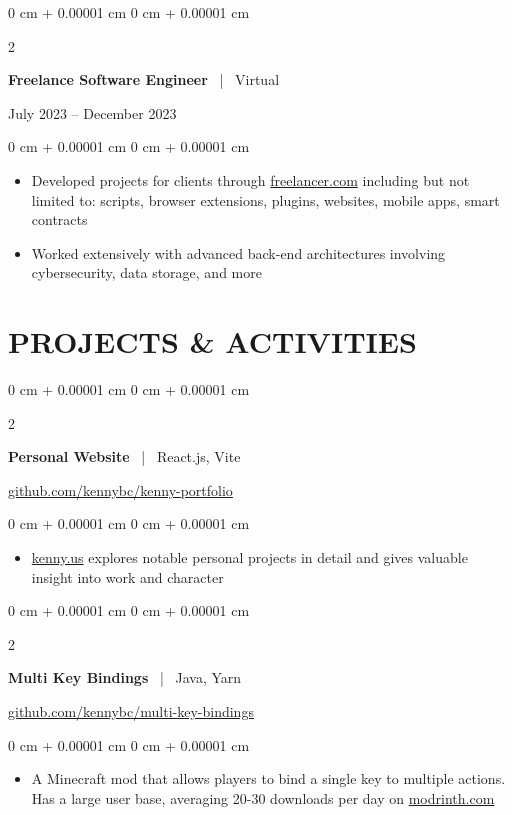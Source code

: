 \documentclass[10pt, letterpaper]{article}
\newenvironment{highlights}{
    \begin{itemize}[
        topsep=0pt,
        parsep=0pt,
        partopsep=0pt,
        itemsep=0pt,
        leftmargin=0 cm + 10pt
    ]
}{
    \end{itemize}
} %
\newenvironment{onecolentry}{
    \begin{adjustwidth}{
        0 cm + 0.00001 cm
    }{
        0 cm + 0.00001 cm
    }
}{
    \end{adjustwidth}
} %
\newenvironment{twocolentry}[2][]{
    \onecolentry
    \def\secondColumn{#2}
    \setcolumnwidth{\fill, 4.5 cm}
    \begin{paracol}{2}
}{
    \switchcolumn \raggedleft \secondColumn
    \end{paracol}
    \endonecolentry
} %
\newenvironment{repoentry}[2][]{
    \onecolentry
    \def\secondColumn{#2}
    \setcolumnwidth{\fill, \fill}
    \begin{paracol}{2}
}{
    \switchcolumn \raggedleft \secondColumn
    \end{paracol}
    \endonecolentry
} %
\begin{document}
	\vspace{0.2 cm}

	\begin{twocolentry}{July 2023 -- December 2023}
            \textbf{Freelance Software Engineer} ~|~ Virtual
	\end{twocolentry}
    \vspace{0.10 cm}
    \begin{onecolentry}
        \begin{highlights}
            \item Developed projects for clients through \href{https://freelancer.com}{freelancer.com} including but not limited to: scripts, browser extensions, plugins, websites, mobile apps, smart contracts
            \item Worked extensively with advanced back-end architectures involving cybersecurity, data storage, and more
        \end{highlights}
    \end{onecolentry}





    
    \section{PROJECTS \& ACTIVITIES}
	
	
	\begin{repoentry}{\href{https://github.com/kennybc/kenny-portfolio}{github.com/kennybc/kenny-portfolio}}
        \textbf{Personal Website} ~|~ React.js, Vite
	\end{repoentry}
    \vspace{0.10 cm}
    \begin{onecolentry}
        \begin{highlights}
            \item \href{https://kenny.us}{kenny.us} explores notable personal projects in detail and gives valuable insight into work and character
        \end{highlights}
    \end{onecolentry}
    
    \vspace{0.2 cm}
    
    \begin{repoentry}{\href{https://github.com/kennybc/multi-key-bindings}{github.com/kennybc/multi-key-bindings}}
    	\textbf{Multi Key Bindings} ~|~ Java, Yarn
    \end{repoentry}
    \vspace{0.10 cm}
    \begin{onecolentry}
    	\begin{highlights}
    		\item A Minecraft mod that allows players to bind a single key to multiple actions. Has a large user base, averaging 20-30 downloads per day on \href{https://modrinth.com/mod/multi-key-bindings}{modrinth.com}
    	\end{highlights}
    \end{onecolentry}
	
\end{document}
